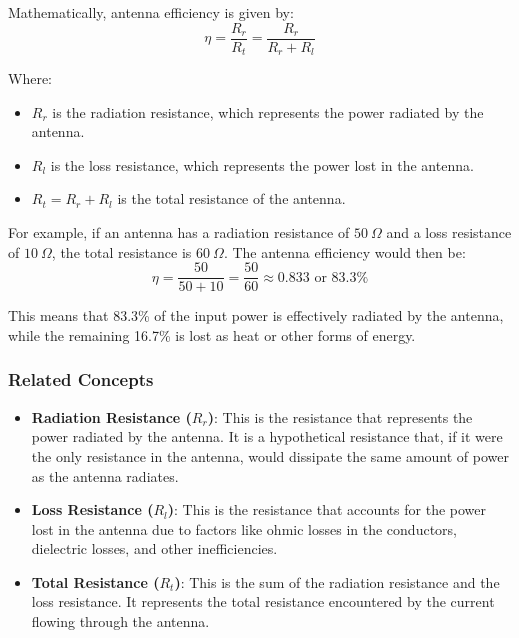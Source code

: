 Mathematically, antenna efficiency is given by:
\[
\eta = \frac{R_r}{R_t} = \frac{R_r}{R_r + R_l}
\]

Where:
\begin{itemize}
    \item \(R_r\) is the radiation resistance, which represents the power radiated by the antenna.
    \item \(R_l\) is the loss resistance, which represents the power lost in the antenna.
    \item \(R_t = R_r + R_l\) is the total resistance of the antenna.
\end{itemize}

For example, if an antenna has a radiation resistance of \(50\ \Omega\) and a loss resistance of \(10\ \Omega\), the total resistance is \(60\ \Omega\). The antenna efficiency would then be:
\[
\eta = \frac{50}{50 + 10} = \frac{50}{60} \approx 0.833 \text{ or } 83.3\%
\]

This means that 83.3\% of the input power is effectively radiated by the antenna, while the remaining 16.7\% is lost as heat or other forms of energy.

\subsubsection{Related Concepts}
\begin{itemize}
    \item \textbf{Radiation Resistance (\(R_r\))}: This is the resistance that represents the power radiated by the antenna. It is a hypothetical resistance that, if it were the only resistance in the antenna, would dissipate the same amount of power as the antenna radiates.
    \item \textbf{Loss Resistance (\(R_l\))}: This is the resistance that accounts for the power lost in the antenna due to factors like ohmic losses in the conductors, dielectric losses, and other inefficiencies.
    \item \textbf{Total Resistance (\(R_t\))}: This is the sum of the radiation resistance and the loss resistance. It represents the total resistance encountered by the current flowing through the antenna.
\end{itemize}

